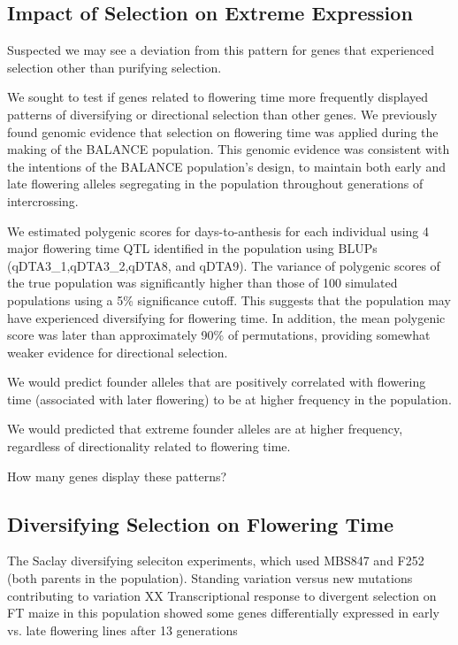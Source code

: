 \documentclass[article,9pt,twocolumn,twoside]{rilabRxiv}
\begin{document}
\subsection{Impact of Selection on Extreme Expression}

Suspected we may see a deviation from this pattern for genes that experienced selection other than purifying selection.

We sought to test if genes related to flowering time more frequently displayed patterns of diversifying or directional selection than other genes.
We previously found genomic evidence that selection on flowering time was applied during the making of the BALANCE population.
This genomic evidence was consistent with the intentions of the BALANCE population's design, to maintain both early and late flowering alleles segregating in the population throughout generations of intercrossing.

We estimated polygenic scores for days-to-anthesis for each individual using 4 major flowering time QTL identified in the population using BLUPs (qDTA3\_1,qDTA3\_2,qDTA8, and qDTA9).
The variance of polygenic scores of the true population was significantly higher than those of 100 simulated populations using a 5\% significance cutoff.
This suggests that the population may have experienced diversifying for flowering time.
In addition, the mean polygenic score was later than approximately 90\% of permutations, providing somewhat weaker evidence for directional selection.

We would predict founder alleles that are positively correlated with flowering time (associated with later flowering) to be at higher frequency in the population.

We would predicted that extreme founder alleles are at higher frequency, regardless of directionality related to flowering time.

How many genes display these patterns?

\subsection{Diversifying Selection on Flowering Time}
The Saclay diversifying seleciton experiments, which used MBS847 and F252 (both parents in the population)\citep{Durand2,Durand3}.
Standing variation versus new mutations contributing to variation XX
Transcriptional response to divergent selection on FT maize in this population showed some genes differentially expressed in early vs. late flowering lines after 13 generations \citep{Tenaillon2} 
\end{document}
